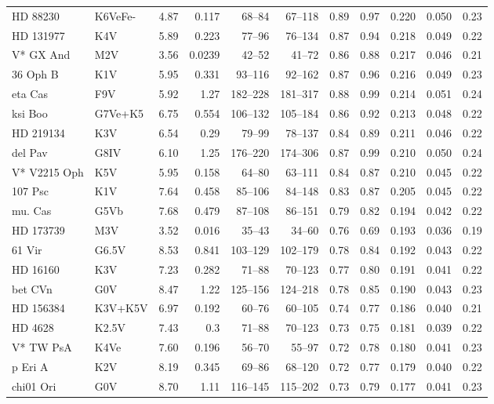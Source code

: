 \documentclass[11pt,a4paper]{article}
\begin{document}
{\begin{longtable}{llrrrrrrrrr}
HD  88230 & K6VeFe- & 4.87 & 0.117 & 68--84 & 67--118 & 0.89 & 0.97 & 0.220 & 0.050 & 0.23 \\
HD 131977 & K4V & 5.89 & 0.223 & 77--96 & 76--134 & 0.87 & 0.94 & 0.218 & 0.049 & 0.22 \\
V* GX And & M2V & 3.56 & 0.0239 & 42--52 & 41--72 & 0.86 & 0.88 & 0.217 & 0.046 & 0.21 \\
36 Oph B & K1V & 5.95 & 0.331 & 93--116 & 92--162 & 0.87 & 0.96 & 0.216 & 0.049 & 0.23 \\
eta Cas & F9V & 5.92 & 1.27 & 182--228 & 181--317 & 0.88 & 0.99 & 0.214 & 0.051 & 0.24 \\
ksi Boo & G7Ve+K5 & 6.75 & 0.554 & 106--132 & 105--184 & 0.86 & 0.92 & 0.213 & 0.048 & 0.22 \\
HD 219134 & K3V & 6.54 & 0.29 & 79--99 & 78--137 & 0.84 & 0.89 & 0.211 & 0.046 & 0.22 \\
del Pav & G8IV & 6.10 & 1.25 & 176--220 & 174--306 & 0.87 & 0.99 & 0.210 & 0.050 & 0.24 \\
V* V2215 Oph & K5V & 5.95 & 0.158 & 64--80 & 63--111 & 0.84 & 0.87 & 0.210 & 0.045 & 0.22 \\
107 Psc & K1V & 7.64 & 0.458 & 85--106 & 84--148 & 0.83 & 0.87 & 0.205 & 0.045 & 0.22 \\
mu. Cas & G5Vb & 7.68 & 0.479 & 87--108 & 86--151 & 0.79 & 0.82 & 0.194 & 0.042 & 0.22 \\
HD 173739 & M3V & 3.52 & 0.016 & 35--43 & 34--60 & 0.76 & 0.69 & 0.193 & 0.036 & 0.19 \\
61 Vir & G6.5V & 8.53 & 0.841 & 103--129 & 102--179 & 0.78 & 0.84 & 0.192 & 0.043 & 0.22 \\
HD  16160 & K3V & 7.23 & 0.282 & 71--88 & 70--123 & 0.77 & 0.80 & 0.191 & 0.041 & 0.22 \\
bet CVn & G0V & 8.47 & 1.22 & 125--156 & 124--218 & 0.78 & 0.85 & 0.190 & 0.043 & 0.23 \\
HD 156384 & K3V+K5V & 6.97 & 0.192 & 60--76 & 60--105 & 0.74 & 0.77 & 0.186 & 0.040 & 0.21 \\
HD   4628 & K2.5V & 7.43 & 0.3 & 71--88 & 70--123 & 0.73 & 0.75 & 0.181 & 0.039 & 0.22 \\
V* TW PsA & K4Ve & 7.60 & 0.196 & 56--70 & 55--97 & 0.72 & 0.78 & 0.180 & 0.041 & 0.23 \\
p Eri A & K2V & 8.19 & 0.345 & 69--86 & 68--120 & 0.72 & 0.77 & 0.179 & 0.040 & 0.22 \\
chi01 Ori & G0V & 8.70 & 1.11 & 116--145 & 115--202 & 0.73 & 0.79 & 0.177 & 0.041 & 0.23 \\

\end{longtable}}
\end{document}
